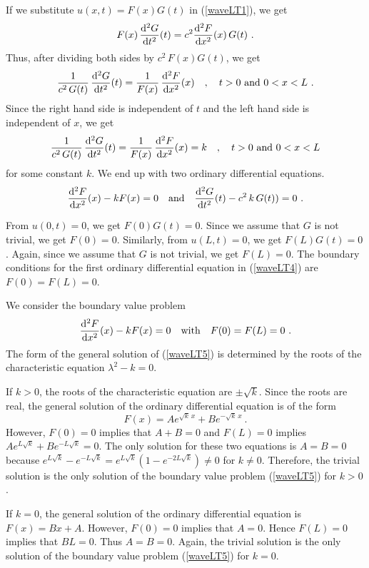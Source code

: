 If we substitute $u(x,t) = F(x)G(t)$ in (\ref{waveLT1}), we get
\[
F(x)\,\frac{\mathrm{d}^{2}{G}}{\mathrm{d}{t}^{2}}(t) = c^2 \frac{\mathrm{d}^{2}{F}}{\mathrm{d}{x}^{2}}(x)\, G(t) \ .
\]
Thus, after dividing both sides by $c^2\,F(x)G(t)$, we get
\[
\frac{1}{c^2\,G(t)} \, \frac{\mathrm{d}^{2}{G}}{\mathrm{d}{t}^{2}}(t) =
\frac{1}{F(x)}\, \frac{\mathrm{d}^{2}{F}}{\mathrm{d}{x}^{2}}(x)
\quad , \quad t>0 \ \text{and} \ 0<x<L \ .
\]
Since the right hand side is independent of $t$ and the left hand side
is independent of $x$, we get
\[
\frac{1}{c^2\,G(t)} \, \dydxn{G}{t}{2}(t) = \frac{1}{F(x)}\,
\dydxn{F}{x}{2}(x) = k \quad , \quad t>0 \ \text{and} \ 0<x<L
\]
for some constant $k$.  We end up with two ordinary differential equations.
\begin{equation} \label{waveLT4}
\frac{\mathrm{d}^{2}{F}}{\mathrm{d}{x}^{2}}(x) -k F(x) = 0 \quad \text{and}
\quad \frac{\mathrm{d}^{2}{G}}{\mathrm{d}{t}^{2}}(t) - c^2\,k\,G(t)) = 0 \ .
\end{equation}

From $\displaystyle u(0,t) = 0$, we get
$F(0)G(t)=0$.  Since we assume that $G$ is not trivial, we get
$F(0)=0$.  Similarly, from $\displaystyle u(L,t) = 0$, we
get $F(L)G(t)=0$.  Again, since we assume that $G$ is not trivial, we
get $F(L)=0$.  The boundary conditions for 
the first ordinary differential equation in (\ref{waveLT4}) are
$F(0)=F(L)=0$.

We consider the boundary value problem
\begin{equation} \label{waveLT5}
\dydxn{F}{x}{2}(x) -k F(x) = 0 \quad \text{with} \quad F(0)=F(L)=0  \ .
\end{equation}
The form of the general solution of (\ref{waveLT5}) is determined by the
roots of the characteristic equation $\lambda^2-k=0$.

If $k>0$, the roots of the characteristic equation are $\pm \sqrt{k}$.
Since the roots are real, the general solution of the ordinary differential
equation is of the form
\[
F(x) = A e^{\sqrt{k}\,x} + B e^{-\sqrt{k}\,x} \ .
\]
However, $F(0)=0$ implies that $A + B = 0$ and $F(L)=0$ implies
$\displaystyle A e^{L\sqrt{k}} + B e^{-L\sqrt{k}} = 0$.
The only solution for these two equations is $A=B=0$ because
$\displaystyle e^{L\sqrt{k}} - e^{-L\sqrt{k}}
= e^{L\sqrt{k}}\left(1-e^{-2L\sqrt{k}}\right) \neq 0$ for $k\neq 0$.
Therefore, the trivial solution is the only solution
of the boundary value problem (\ref{waveLT5}) for $k>0$.

If $k=0$, the general solution of the ordinary differential equation
is $F(x)=B x+ A$.  However, $F(0)=0$ implies that $A=0$.  Hence $F(L)=0$
implies that $B L = 0$.  Thus $A = B = 0$.  Again, the trivial
solution is the only solution of the boundary value problem
(\ref{waveLT5}) for $k =0$.

